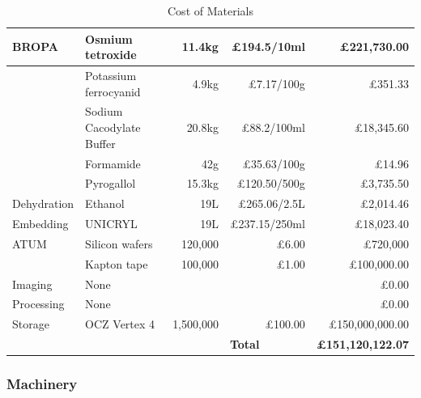 \documentclass[a4paper, 11pt]{article}
\numberwithin{equation}{section}
\begin{document}
\begin{table}[H]
{\begin{tabular}{|l|l|l|l|l|}
BROPA	&	Osmium tetroxide	&	\multicolumn{1}{r|}{	11.4kg	}	&	\multicolumn{1}{r|}{	\pounds 194.5/10ml	}	&	\multicolumn{1}{r|}{		\pounds 221,730.00	}	\\	\hline
	&	Potassium ferrocyanid	&	\multicolumn{1}{r|}{	4.9kg	}	&	\multicolumn{1}{r|}{	\pounds 7.17/100g	}	&	\multicolumn{1}{r|}{	\pounds	351.33	}	\\	\hline
	&	Sodium Cacodylate Buffer	&	\multicolumn{1}{r|}{	20.8kg	}	&	\multicolumn{1}{r|}{	\pounds	88.2/100ml	}	&	\multicolumn{1}{r|}{		\pounds 18,345.60	}	\\	\hline
	&	Formamide	&	\multicolumn{1}{r|}{	42g	}	&	\multicolumn{1}{r|}{	\pounds	35.63/100g	}	&	\multicolumn{1}{r|}{	\pounds	14.96	}	\\	\hline
	&	Pyrogallol	&	\multicolumn{1}{r|}{	15.3kg	}	&	\multicolumn{1}{r|}{	\pounds	120.50/500g	}	&	\multicolumn{1}{r|}{	\pounds	3,735.50	}	\\	\hline
Dehydration	&	Ethanol	&	\multicolumn{1}{r|}{	19L	}	&	\multicolumn{1}{r|}{	\pounds	265.06/2.5L	}	&	\multicolumn{1}{r|}{	\pounds	2,014.46	}	\\	\hline
Embedding	&	UNICRYL	&	\multicolumn{1}{r|}{	19L	}	&	\multicolumn{1}{r|}{	\pounds	237.15/250ml	}	&	\multicolumn{1}{r|}{	\pounds	18,023.40	}	\\	\hline
ATUM	&	Silicon wafers	&	\multicolumn{1}{r|}{	120,000	}	&	\multicolumn{1}{r|}{	\pounds 6.00	}	&	\multicolumn{1}{r|}{	\pounds 720,000	}	\\	\hline
	&	Kapton tape	&	\multicolumn{1}{r|}{	100,000	}	&	\multicolumn{1}{r|}{	\pounds 1.00	}	&	\multicolumn{1}{r|}{	\pounds	100,000.00}	\\	\hline
Imaging	&	None &	\multicolumn{1}{r|}{		}	&	\multicolumn{1}{r|}{			}	&	\multicolumn{1}{r|}{	\pounds 0.00	}	\\	\hline
Processing	&	None	&	\multicolumn{1}{r|}{		}	&	\multicolumn{1}{r|}{	}	&	\multicolumn{1}{r|}{	\pounds 0.00	}	\\	\hline
Storage 	&	OCZ Vertex 4                                               	&	\multicolumn{1}{r|}{	1,500,000	}	&	\multicolumn{1}{r|}{	\pounds	100.00	}	&	\multicolumn{1}{r|}{	\pounds	150,000,000.00	}	\\	\hline
 	&	  	&	& \textbf{Total}	&	\textbf{\pounds 151,120,122.07} \\	\hline
\end{tabular}
}
\captionsetup{justification=centering}
\caption{Cost of Materials}
\label{table:materialcosts}
\end{table}

\subsubsection{Machinery}
\end{document}
